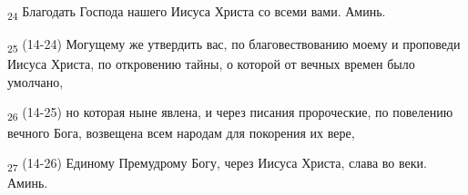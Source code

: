 \begin{tcolorbox}
\textsubscript{24} Благодать Господа нашего Иисуса Христа со всеми вами. Аминь.
\end{tcolorbox}
\begin{tcolorbox}
\textsubscript{25} (14-24) Могущему же утвердить вас, по благовествованию моему и проповеди Иисуса Христа, по откровению тайны, о которой от вечных времен было умолчано,
\end{tcolorbox}
\begin{tcolorbox}
\textsubscript{26} (14-25) но которая ныне явлена, и через писания пророческие, по повелению вечного Бога, возвещена всем народам для покорения их вере,
\end{tcolorbox}
\begin{tcolorbox}
\textsubscript{27} (14-26) Единому Премудрому Богу, через Иисуса Христа, слава во веки. Аминь.
\end{tcolorbox}
